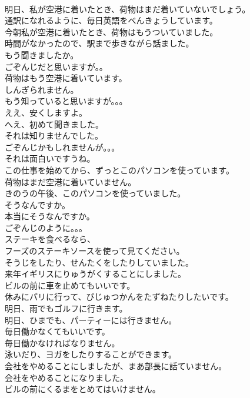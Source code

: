 \documentclass[8pt]{extreport}
\begin{document}
\begin{CJK}{UTF8}{min}
\\	明日、私が空港に着いたとき、荷物はまだ着いていないでしょう。
\\	通訳になれるように、毎日英語をべんきょうしています。
\\	今朝私が空港に着いたとき、荷物はもうついていました。
\\	時間がなかったので、駅まで歩きながら話ました。
\\	もう聞きましたか。
\\	ごぞんじだと思いますが。。
\\	荷物はもう空港に着いています。
\\	しんぎられません。
\\	もう知っていると思いますが。。。
\\	ええ、安くしますよ。
\\	へえ、初めて聞きました。
\\	それは知りませんでした。
\\	ごぞんじかもしれませんが。。。
\\	それは面白いですうね。
\\	この仕事を始めてから、ずっとこのパソコンを使っています。
\\	荷物はまだ空港に着いていません。
\\	きのうの午後、このパソコンを使っていました。
\\	そうなんですか。
\\	本当にそうなんですか。
\\	ごぞんじのように。。。
\\	ステーキを食べるなら、
\\	フーズのステーキソースを使って見てください。
\\	そうじをしたり、せんたくをしたりしていました。
\\	来年イギリスにりゅうがくすることにしました。
\\	ビルの前に車を止めてもいいです。
\\	休みにパリに行って、びじゅつかんをたずねたりしたいです。
\\	明日、雨でもゴルフに行きます。
\\	明日、ひまでも、パーティーには行きません。
\\	毎日働かなくてもいいです。
\\	毎日働かなければなりません。
\\	泳いだり、ヨガをしたりすることができます。
\\	会社をやめることにしましたが、まあ部長に話ていません。
\\	会社をやめることになりました。
\\	ビルの前にくるまをとめてはいけません。

\end{CJK}
\end{document}
